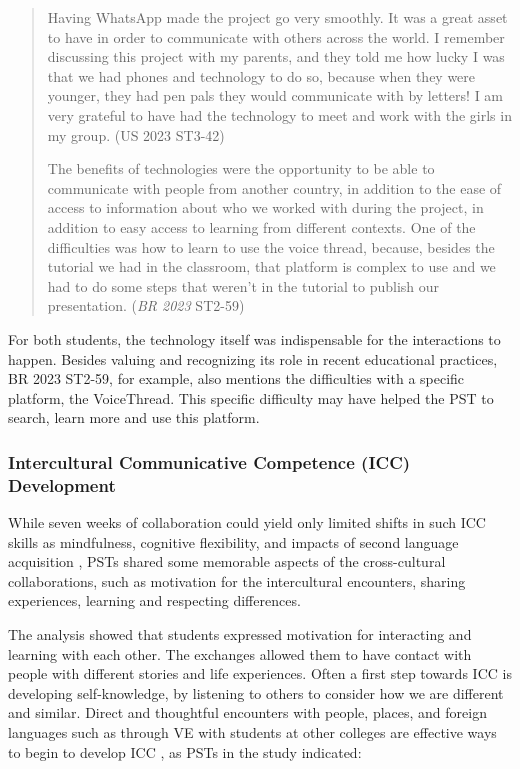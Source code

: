 \begin{quote}
Having WhatsApp made the project go very smoothly. It was a great
asset to have in order to communicate with others across the world. I
remember discussing this project with my parents, and they told me how
lucky I was that we had phones and technology to do so, because when
they were younger, they had pen pals they would communicate with by
letters! I am very grateful to have had the technology to meet and work
with the girls in my group. (US 2023 ST3-42)

The benefits of technologies were the opportunity to be able to
communicate with people from another country, in addition to the ease of
access to information about who we worked with during the project, in
addition to easy access to learning from different contexts. One of the
difficulties was how to learn to use the voice thread, because, besides
the tutorial we had in the classroom, that platform is complex to use
and we had to do some steps that weren’t in the tutorial
to publish our presentation. (\emph{BR 2023} ST2-59)
\end{quote}

For both students, the technology itself was indispensable for the
interactions to happen. Besides valuing and recognizing its role in
recent educational practices, BR 2023 ST2-59, for example, also
mentions the difficulties with a specific platform, the VoiceThread.
This specific difficulty may have helped the PST to search, learn more
and use this platform.

\subsubsection{Intercultural Communicative Competence (ICC) Development}\label{sub-sub-sec-intercultural}

While seven weeks of collaboration could yield only limited shifts in
such ICC skills as mindfulness, cognitive flexibility, and impacts of
second language acquisition \cite{idris2019intercultural,uzum2020using}, 
PSTs shared some memorable aspects of the cross-cultural
collaborations, such as motivation for the intercultural encounters,
sharing experiences, learning and respecting differences.

The analysis showed that students expressed motivation for interacting
and learning with each other. The exchanges allowed them to have contact
with people with different stories and life experiences. Often a first
step towards ICC is developing self-knowledge, by listening to others to
consider how we are different and similar. Direct and thoughtful
encounters with people, places, and foreign languages such as through VE
with students at other colleges are effective ways to begin to develop
ICC \cite{idris2019intercultural,lopez2017developing}, as PSTs in the
study indicated:

